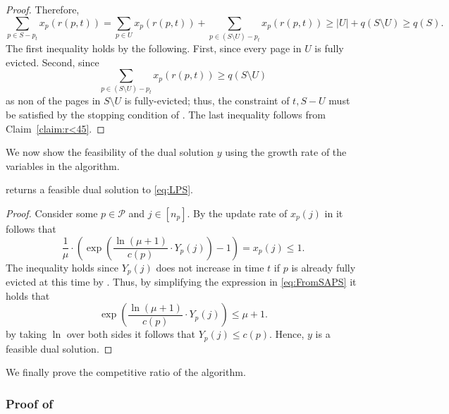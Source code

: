 \documentclass[11pt]{article}
\newcommand{\cP}{{\mathcal{P}}}
\begin{document}
\begin{proof}
	Therefore, 
	$$\sum_{p \in S-p_t} x_p(r(p,t)) = \sum_{p \in U} x_p(r(p,t))+\sum_{p \in (S\setminus U)-p_t} x_p(r(p,t)) \geq |U|+q(S \setminus U) \geq q(S).$$
	The first inequality holds by the following. First, since every page in $U$ is fully evicted. Second, since $$\sum_{p \in (S\setminus U)-p_t} x_p(r(p,t)) \geq q(S \setminus U)$$ as non of the pages in $S \setminus U$ is fully-evicted; thus, the constraint of $t,S-U$ must be satisfied by the stopping condition of .  The last inequality follows from Claim~\ref{claim:r<45}. 
\end{proof}


We now show the feasibility of the dual solution $y$ using the growth rate of the variables in the algorithm. 
	\begin{lemma}
	\label{lem:FFeasibleS}
	 returns a feasible dual solution to \eqref{eq:LPS}. 
\end{lemma}

\begin{proof}
	Consider some $p \in \cP$ and $j \in [n_p]$. By the update rate of $x_p(j)$ in  it follows that 
	\begin{equation}
		\label{eq:FromSAPS}
		\frac{1}{\mu} \cdot \left(     \exp \left(  \frac{\ln (\mu+1)}{c(p)} \cdot Y_p(j)\right)-1\right) = x_p(j) \leq 1.
	\end{equation} 
	The inequality holds since $Y_p(j)$ does not increase in time $t$ if $p$ is already fully evicted at this time by . Thus, by simplifying the expression in \eqref{eq:FromSAPS} it holds that 
	$$\exp \left( \frac{\ln (\mu+1)}{c(p)} \cdot Y_p(j) \right) \leq \mu+1.$$
	by taking $\ln$ over both sides it follows that $Y_p(j) \leq c(p)$. Hence, $y$ is a feasible dual solution. 
\end{proof}

We finally prove the competitive ratio of the algorithm.


\subsubsection*{Proof of }
\end{document}

